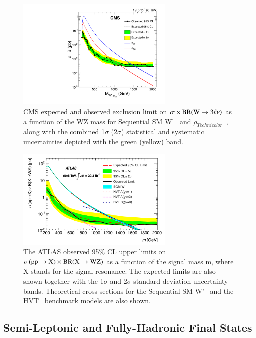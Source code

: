 \documentclass[3p,times,twocolumn]{elsarticle}
\begin{document}
\begin{figure}[htbp]
\centering
\includegraphics[width=7.5cm]{CMS_WZ_FullyLept_limit.pdf}
\caption{CMS expected and observed exclusion limit on 
$\sigma \times \rm{BR(}\rm{W}\rightarrow 3\ell\nu\rm{)}$ 
as a function of the WZ mass for Sequential SM
W'~\cite{Altarelli:1989ff} and $\rho_{Technicolor}$~\cite{Susskind:1978ms,Lane:1999uh,Eichten:2007sx},  
along with the combined 1$\sigma$ (2$\sigma$) statistical and 
systematic uncertainties depicted with 
the green (yellow) band.}\label{fig:CMS_WZ_FullyLept_limit}
\end{figure}

\begin{figure}[htbp]
\centering
\includegraphics[width=7.5cm]{ATLAS_WZ_FullyLept_limit.pdf}
\caption{The ATLAS observed 95\% CL upper limits on
  $\sigma(\rm{pp}\rightarrow\rm{X}) \times \rm{BR(X}\rightarrow\rm{WZ)}$ 
as a function of the signal mass m, where X stands for the signal resonance. 
The expected limits are also shown together with the 1$\sigma$  and 2$\sigma$
standard deviation uncertainty bands. Theoretical cross sections for
the Sequential SM W'~\cite{Altarelli:1989ff} and the HVT~\cite{Pappadopulo:2014qza} benchmark models are also shown.}
\label{fig:ATLAS_WZ_FullyLept_limit}
\end{figure}

\subsection{Semi-Leptonic and Fully-Hadronic Final States}
\label{sec:VVWithJets}
\end{document}
